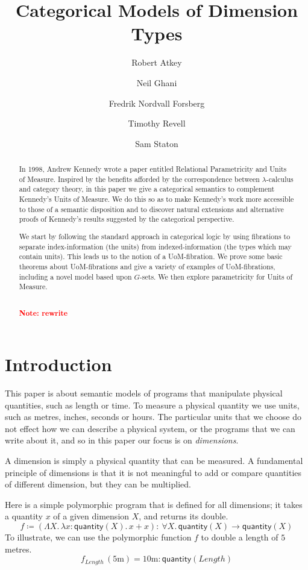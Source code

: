 \documentclass[a4paper,UKenglish]{lipics}
\title{Categorical Models of Dimension Types}
\author[1]{Robert Atkey}
\author[2]{Neil Ghani}
\author[2]{Fredrik Nordvall Forsberg}
\author[2]{Timothy Revell}
\author[3]{Sam Staton}
\affil[1]{University of Edinburgh}
\affil[2]{University of Strathclyde}
\affil[3]{University of Cambridge}
\newcommand\note[1]{{ \bf \textcolor{red} {\vspace{2mm}\; \\ Note: #1\\}}}
\newcommand{\UoM}{Units of Measure\xspace}
\newcommand{\msf}[1]{\mathsf{#1}} %
\newcommand{\qnt}{\msf{quantity}}
\newcommand{\lengthDim}{\mathit{Length}}
\newcommand{\UoMFibrations}{UoM-fibrations\xspace}
\begin{document}
\maketitle

\begin{abstract}

  In 1998, Andrew Kennedy wrote a paper entitled Relational Parametricity and \UoM\cite{Kennedy:1997:RPU:263699.263761}. Inspired by the benefits afforded by the correspondence between $\lambda$-calculus and category theory, in this paper we give a categorical semantics to complement Kennedy's \UoM. We do this so as to make Kennedy's work more accessible to those of a semantic disposition and to discover natural extensions and alternative proofs of Kennedy's results suggested by the categorical perspective.

  We start by following the standard approach in categorical logic by using fibrations to separate index-information (the units) from indexed-information (the types which may contain units). This leads us to the notion of a UoM-fibration. We prove some basic theorems about UoM-fibrations and give a variety of examples of \UoMFibrations, including a novel model based upon $G$-sets. We then explore parametricity for \UoM.

  \note{rewrite}
\end{abstract}

\section{Introduction}
This paper is about semantic models of programs that manipulate physical quantities, such as length or time. To measure a physical quantity we use units, such as metres, inches, seconds or hours. The particular units that we choose do not effect how we can describe a physical system, or the programs that we can write about it, and so in this paper our focus is on \emph{dimensions}.

A dimension is simply a physical quantity that can be measured. A fundamental principle of dimensions is that it is not meaningful to add or compare quantities of different dimension, but they can be multiplied.

Here is a simple polymorphic program that is defined for all dimensions; it takes a quantity $x$ of a given dimension $X$, and returns its double.
\begin{equation}
f\coloneqq (\Lambda X.\,\lambda x:\qnt(X).\,x+x)
:\ \forall X.\,\qnt(X)\to \qnt(X)
\label{eqn:double}
\end{equation}
To illustrate, we can use the polymorphic function $f$ to double a length of $5$ metres.
\begin{equation}
f_\lengthDim\,(5\mathrm{m})=
10\mathrm{m}:\qnt(\lengthDim)
\label{eqn:doubleapp}
\end{equation}
\end{document}
